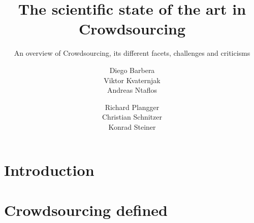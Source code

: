 \documentclass{sig-alternate}
\begin{document}
\title{The scientific state of the art in Crowdsourcing}
\subtitle{An overview of Crowdsourcing, its different facets, challenges and criticisms}


\author{%
\alignauthor
Diego Barbera\\ 
%
\alignauthor
Viktor Kvaternjak\\
%
\alignauthor
Andreas Ntaflos\\
%
\and
%
\alignauthor
Richard Plangger\\ 
%
\alignauthor
Christian Schnitzer\\ 
%
\alignauthor
Konrad Steiner\\ 
\and
}

\maketitle

\begin{abstract}
\end{abstract}

\section{Introduction}

\section{Crowdsourcing defined}
\end{document}
